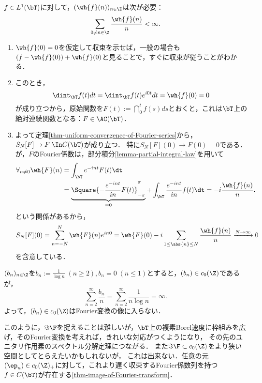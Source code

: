\documentclass[uplatex,dvipdfmx]{jsreport}
\begin{document}
\begin{theorem}[Fourier級数であるための必要条件]
    $f\in L^1(\bT)$に対して，$(\wh{f}(n))_{n\in\Z}$は次が必要：
    \[\sum_{0\ne n\in\Z}\frac{\wh{f}(n)}{n}<\infty.\]
\end{theorem}
\begin{Proof}\mbox{}
    \begin{enumerate}
        \item $\wh{f}(0)=0$を仮定して収束を示せば，一般の場合も$(f-\wh{f}(0))+\wh{f}(0)$と見ることで，すぐに収束が従うことがわかる．
        \item このとき，
        \[\dint_\bT f(t)dt=\dint_\bT f(t)e^{i0t}dt=\wh{f}(0)=0\]
        が成り立つから，原始関数を$F(t):=\dint^t_0f(s)ds$とおくと，これは$\bT$上の絶対連続関数となる：$F\in\AC(\bT)$．
        \item よって定理\ref{thm-uniform-convergence-of-Fourier-series}から，$S_N[F]\to F\;\In C(\bT)$が成り立つ．
        特に$S_N[F](0)\to F(0)=0$である．
        が，$F$のFourier係数は，部分積分\ref{lemma-partial-integral-law}を用いて
        \begin{align*}
            \forall_{n\ne0}\wh{F}(n)&=\int_\bT e^{-int}F(t)\dt\\
            &=\underbrace{\Square{-\frac{e^{-int}}{in}F(t)}^\pi_{-\pi}}_{=0}+\int_{\bT}\frac{e^{-int}}{in}f(t)\dt=-i\frac{\wh{f}(n)}{n}.
        \end{align*}
        という関係があるから，
        \[S_N[F](0)=\sum_{n=-N}^N\wh{F}(n)e^{in0}=\wh{F}(0)-i\sum_{1\le\abs{n}\le N}\frac{\wh{f}(n)}{n}\xrightarrow{N\to\infty}0\]
        を含意している．
    \end{enumerate}
\end{Proof}

\begin{example}
    $(b_n)_{n\in\Z}$を$b_n:=\frac{1}{\log n}\;(n\ge2),b_n=0\;(n\le 1)$とすると，$(b_n)\in c_0(\Z)$であるが，
    \[\sum_{n=2}^\infty\frac{b_n}{n}=\sum_{n=2}^\infty\frac{1}{n\log n}=\infty.\]
    よって，$(b_n)\in c_0(\Z)$はFourier変換の像に入らない．
\end{example}
\begin{remarks}
    このように，$\Im\F$を捉えることは難しいが，$\bT$上の複素Borel速度に枠組みを広げ，そのFourier変換を考えれば，きれいな対応がつくようになり，
    その先のユニタリ作用素のスペクトル分解定理につながる．
    また$\Im\F\subset c_0(\Z)$をより狭い空間としてとらえたいかもしれないが，
    これは出来ない．任意の元$(\ep_n)\in c_0(\Z)_+$に対して，これより遅く収束するFourier係数列を持つ$f\in C(\bT)$が存在する\ref{thm-image-of-Fourier-transform}．
\end{remarks}
\end{document}
